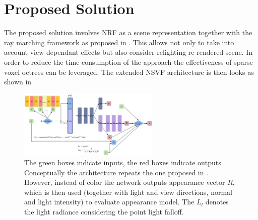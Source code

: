 \documentclass[english]{article}
\begin{document}


\section{Proposed Solution}

The proposed solution involves NRF as a scene representation together with the ray marching framework as proposed in \cite{nrf2020}. This allows not only to take into account view-dependant effects but also consider relighting re-rendered scene. In order to reduce the time consumption of the approach the effectiveness of sparse voxel octrees \cite{nsvf2020} can be leveraged. The extended NSVF architecture is then looks as shown in 


\begin{figure}[t]
    \centering
    \includegraphics[width=0.6\textwidth]{img/mlp_nsvfnrf_explicit.png}
    \caption{The green boxes indicate inputs, the red boxes indicate outputs.
    Conceptually the architecture repeats the one proposed in \cite{nsvf2020}. However, instead of color the network outputs appearance vector $R$, which is then used (together with light and view directions, normal and light intensity) to evaluate appearance model. The $L_l$ denotes the light radiance considering the point light falloff.}
    \label{fig:mlp_nsvfnrf_explicit}
\end{figure}

\end{document}
